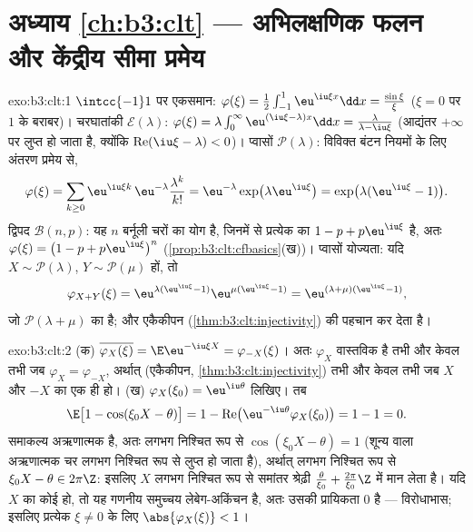 \section*{अध्याय \ref{ch:b3:clt} --- अभिलक्षणिक फलन और
केंद्रीय सीमा प्रमेय}

\begin{solution}{exo:b3:clt:1}
$\intcc{-1}1$ पर एकसमान: $\varphi(\xi) =
\frac12\int_{-1}^1\eu^{\iu\xi x}\dd x =
\frac{\sin\xi}{\xi}$ ($\xi = 0$ पर $1$ के बराबर)।
चरघातांकी $\mathcal E(\lambda)$: $\varphi(\xi) =
\lambda\int_0^\infty\eu^{(\iu\xi - \lambda)x}\dd x =
\frac{\lambda}{\lambda - \iu\xi}$ (आद्यंतर $+\infty$ पर
लुप्त हो जाता है, क्योंकि $\operatorname{Re}(\iu\xi -
\lambda) < 0$)। प्वासों $\mathcal P(\lambda)$: विविक्त
बंटन नियमों के लिए अंतरण प्रमेय से,
\[
\varphi(\xi) = \sum_{k\geq0}\eu^{\iu\xi
k}\,\eu^{-\lambda}\frac{\lambda^k}{k!}
= \eu^{-\lambda}\exp\bigl(\lambda\eu^{\iu\xi}\bigr)
= \exp\bigl(\lambda(\eu^{\iu\xi} - 1)\bigr).
\]
द्विपद $\mathcal B(n, p)$: यह $n$  बर्नूली चरों का
योग है, जिनमें से प्रत्येक का  $1 - p +
p\eu^{\iu\xi}$ है, अतः $\varphi(\xi) = \bigl(1 - p +
p\eu^{\iu\xi}\bigr)^n$
(\cref{prop:b3:clt:cfbasics}(ख))। प्वासों योज्यता: यदि $X
\sim \mathcal P(\lambda)$, $Y \sim \mathcal P(\mu)$
 हों, तो
\[
\varphi_{X+Y}(\xi) = \eu^{\lambda(\eu^{\iu\xi}-1)}
\eu^{\mu(\eu^{\iu\xi}-1)} =
\eu^{(\lambda+\mu)(\eu^{\iu\xi}-1)},
\]
जो $\mathcal P(\lambda + \mu)$ का  है; और
एकैकीपन (\cref{thm:b3:clt:injectivity})  की पहचान
कर देता है।
\end{solution}

\begin{solution}{exo:b3:clt:2}
(क) $\overline{\varphi_X(\xi)} = \E\eu^{-\iu\xi X} =
\varphi_{-X}(\xi)$। अतः $\varphi_X$ वास्तविक है तभी और केवल
तभी जब $\varphi_X = \varphi_{-X}$, अर्थात् (एकैकीपन,
\cref{thm:b3:clt:injectivity}) तभी और केवल तभी जब $X$ और
$-X$ का  एक ही हो।
(ख) $\varphi_X(\xi_0) = \eu^{\iu\theta}$ लिखिए। तब
\[
\E\bigl[1 - \cos(\xi_0X - \theta)\bigr]
= 1 - \operatorname{Re}\bigl(\eu^{-\iu\theta}
\varphi_X(\xi_0)\bigr) = 1 - 1 = 0 .
\]
समाकल्य अऋणात्मक है, अतः लगभग निश्चित रूप से
$\cos(\xi_0X - \theta) = 1$ (शून्य  वाला अऋणात्मक
चर लगभग निश्चित रूप से लुप्त हो जाता है), अर्थात् लगभग
निश्चित रूप से $\xi_0X - \theta \in 2\pi\Z$: इसलिए $X$ लगभग
निश्चित रूप से समांतर श्रेढ़ी
$\frac{\theta}{\xi_0} + \frac{2\pi}{\xi_0}\Z$ में मान लेता
है। यदि $X$ का कोई  हो, तो यह गणनीय समुच्चय लेबेग-अकिंचन
है, अतः उसकी प्रायिकता $0$ है --- विरोधाभास; इसलिए प्रत्येक
$\xi \neq 0$ के लिए $\abs{\varphi_X(\xi)} < 1$।
\end{solution}


